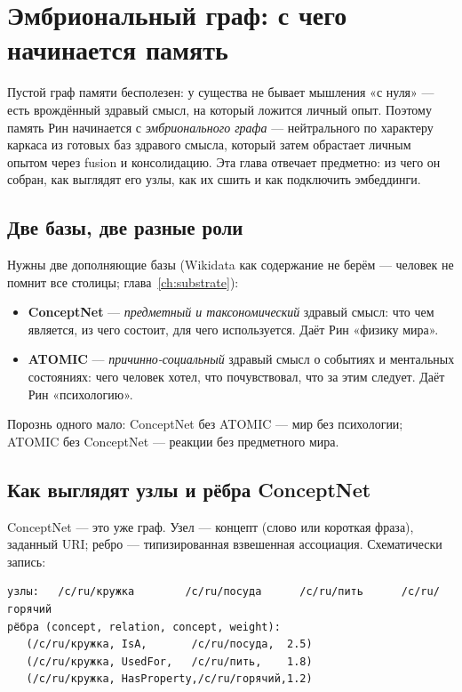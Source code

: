\chapter{Эмбриональный граф: с чего начинается память}
\label{ch:embryonic}

Пустой граф памяти бесполезен: у существа не бывает мышления «с нуля» — есть
врождённый здравый смысл, на который ложится личный опыт. Поэтому память Рин
начинается с \emph{эмбрионального графа} — нейтрального по характеру каркаса из
готовых баз здравого смысла, который затем обрастает личным опытом через fusion и
консолидацию. Эта глава отвечает предметно: из чего он собран, как выглядят его
узлы, как их сшить и как подключить эмбеддинги.

\section{Две базы, две разные роли}

Нужны две дополняющие базы (Wikidata как содержание не берём — человек не помнит
все столицы; глава~\ref{ch:substrate}):

\begin{itemize}
\item \textbf{ConceptNet} — \emph{предметный и таксономический} здравый смысл: что
чем является, из чего состоит, для чего используется. Даёт Рин «физику мира».
\item \textbf{ATOMIC} — \emph{причинно-социальный} здравый смысл о событиях и
ментальных состояниях: чего человек хотел, что почувствовал, что за этим следует.
Даёт Рин «психологию».
\end{itemize}
Порознь одного мало: ConceptNet без ATOMIC — мир без психологии; ATOMIC без
ConceptNet — реакции без предметного мира.

\section{Как выглядят узлы и рёбра ConceptNet}

ConceptNet — это уже граф. Узел — концепт (слово или короткая фраза), заданный
URI; ребро — типизированная взвешенная ассоциация. Схематически запись:

\begin{lstlisting}[style=pseudo]
узлы:   /c/ru/кружка        /c/ru/посуда      /c/ru/пить      /c/ru/горячий
рёбра (concept, relation, concept, weight):
   (/c/ru/кружка, IsA,       /c/ru/посуда,  2.5)
   (/c/ru/кружка, UsedFor,   /c/ru/пить,    1.8)
   (/c/ru/кружка, HasProperty,/c/ru/горячий,1.2)
\end{lstlisting}

